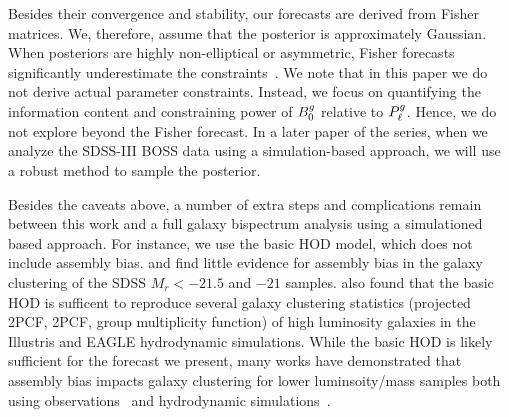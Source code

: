Besides their convergence and stability, our forecasts are derived from Fisher
matrices. We, therefore, assume that the posterior is approximately Gaussian. 
When posteriors are highly non-elliptical or asymmetric, Fisher forecasts 
significantly underestimate the constraints~\citep{wolz2012}. We note that in
this paper we do not derive actual parameter constraints. Instead, we focus on
quantifying the information content and constraining power of $B^g_0$ relative to
$P^g_{\ell}$. Hence, we do not explore beyond the Fisher forecast. In a later paper of 
the series, when we analyze the SDSS-III BOSS data using a simulation-based 
approach, we will use a robust method to sample the posterior.  

Besides the caveats above, a number of extra steps and complications remain
between this work and a full galaxy bispectrum analysis using a simulationed
based approach. For instance, we use the basic \cite{zheng2007} HOD model,
which does not include assembly bias. \cite{zentner2016} and \cite{vakili2019}
find little evidence for assembly bias in the galaxy clustering
of the SDSS $M_r < -21.5$  and $-21$ samples. \cite{beltz-mohrmann2020} 
also found that the basic HOD is sufficent to reproduce several galaxy
clustering statistics (\eg projected 2PCF, 2PCF, group multiplicity function)
of high luminosity galaxies in the Illustris and EAGLE hydrodynamic
simulations. While the basic HOD is likely sufficient for the forecast we
present, many works have demonstrated that assembly bias impacts galaxy
clustering for lower luminsoity/mass samples both using
observations~\citep{pujol2014, hearin2016, pujol2017, zentner2019, vakili2019, obuljen2020}
and hydrodynamic simulations~\citep{chaves-montero2016, beltz-mohrmann2020}. 
 
